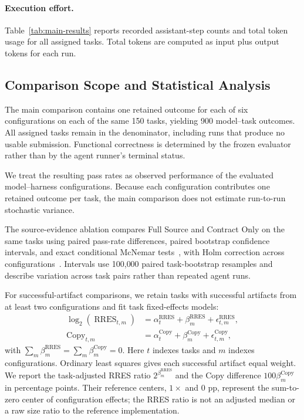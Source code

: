 \documentclass[acmsmall,screen,review,anonymous]{acmart}
\begin{document}
\paragraph{Execution effort.}
Table~\ref{tab:main-results} reports recorded assistant-step counts and total
token usage for all assigned tasks. Total tokens are computed as input plus
output tokens for each run.

\subsection{Comparison Scope and Statistical Analysis}

The main comparison contains one retained outcome for each of six configurations
on each of the same 150 tasks, yielding 900 model--task outcomes. All assigned
tasks remain in the denominator, including runs that produce no usable
submission. Functional correctness is determined by the frozen evaluator rather
than by the agent runner's terminal status.

We treat the resulting pass rates as observed performance of the evaluated
model--harness configurations. Because each configuration contributes one
retained outcome per task, the main comparison does not estimate run-to-run
stochastic variance.

The source-evidence ablation compares Full Source and Contract Only on the same
tasks using paired pass-rate differences, paired bootstrap confidence intervals,
and exact conditional McNemar tests~\cite{fagerland2013mcnemar}, with Holm
correction across configurations~\cite{holm1979multiple}. Intervals use
100{,}000 paired task-bootstrap resamples and describe variation across task
pairs rather than repeated agent runs.

For successful-artifact comparisons, we retain tasks with successful artifacts
from at least two configurations and fit task fixed-effects models:
\begin{equation}
\begin{aligned}
  \log_2\!\left(\operatorname{RRES}_{t,m}\right)
    &= \alpha_t^{\mathrm{RRES}} + \beta_m^{\mathrm{RRES}}
       + \epsilon_{t,m}^{\mathrm{RRES}}, \\
  \operatorname{Copy}_{t,m}
    &= \alpha_t^{\mathrm{Copy}} + \beta_m^{\mathrm{Copy}}
       + \epsilon_{t,m}^{\mathrm{Copy}},
\end{aligned}
\label{eq:adjusted-footprint}
\end{equation}
with $\sum_m\beta_m^{\mathrm{RRES}}=\sum_m\beta_m^{\mathrm{Copy}}=0$.
Here $t$ indexes tasks and $m$ indexes configurations. Ordinary least squares
gives each successful artifact equal weight. We report the task-adjusted RRES
ratio $2^{\beta_m^{\mathrm{RRES}}}$ and the Copy difference
$100\beta_m^{\mathrm{Copy}}$ in percentage points. Their reference centers,
$1\times$ and 0 pp, represent the sum-to-zero center of configuration effects;
the RRES ratio is not an adjusted median or a raw size ratio to the reference
implementation.
\end{document}
